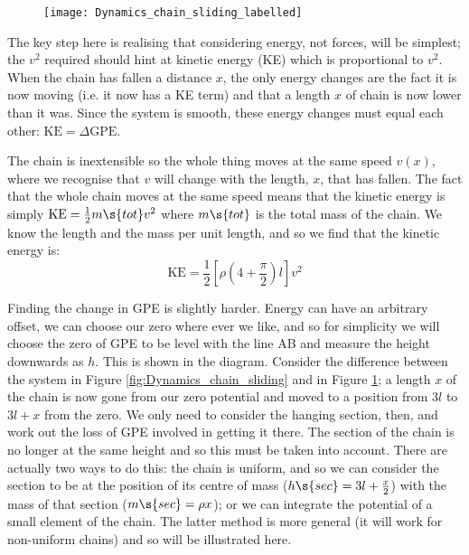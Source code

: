 \begin{problem}
{\begin{enumerate}
\begin{figure}[h!]
\centering
\texttt{[image: Dynamics\_chain\_sliding\_labelled]}
\caption{}
\label{fig:Dynamics_chain_sliding_labelled}
\end{figure}

The key step here is realising that considering energy, not forces, will be simplest; the $v^{2}$ required should hint at kinetic energy (KE) which is proportional to $v^{2}$. When the chain has fallen a distance $x$, the only energy changes are the fact it is now moving (i.e. it now has a KE term) and that a length $x$ of chain is now lower than it was. Since the system is smooth, these energy changes must equal each other: $\textrm{KE} = \Delta \textrm{GPE}$.

The chain is inextensible so the whole thing moves at the same speed $v(x)$, where we recognise that $v$ will change with the length, $x$, that has fallen. The fact that the whole chain moves at the same speed means that the kinetic energy is simply $\textrm{KE} = \frac{1}{2}m\s{tot}v^{2}$ where $m\s{tot}$ is the total mass of the chain. We know the length and the mass per unit length, and so we find that the kinetic energy is:
	\begin{equation*} \textrm{KE} = \frac{1}{2}\left[\rho\left(4 + \frac{\pi}{2}\right)l\right]v^{2} \end{equation*}

Finding the change in GPE is slightly harder. Energy can have an arbitrary offset, we can choose our zero where ever we like, and so for simplicity we will choose the zero of GPE to be level with the line AB and measure the height downwards as $h$. This is shown in the diagram. Consider the difference between the system in Figure \ref{fig:Dynamics_chain_sliding} and in Figure \ref{fig:Dynamics_chain_sliding_labelled}; a length $x$ of the chain is now gone from our zero potential and moved to a position from $3l$ to $3l + x$ from the zero. We only need to consider the hanging section, then, and work out the loss of GPE involved in getting it there. The section of the chain is no longer at the same height and so this must be taken into account. There are actually two ways to do this: the chain is uniform, and so we can consider the section to be at the position of its centre of mass ($h\s{sec} = 3l + \frac{x}{2}$) with the mass of that section ($m\s{sec} = \rho x$); or we can integrate the potential of a small element of the chain. The latter method is more general (it will work for non-uniform chains) and so will be illustrated here.


\end{enumerate}}
\end{problem}
